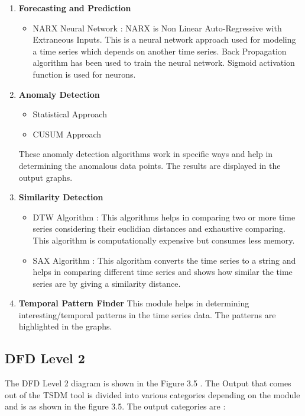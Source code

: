 \documentclass[12pt,a4paper]{report}
\begin{document}
\begin{enumerate}

\item \textbf{Forecasting and Prediction}
\begin{itemize}
\item  NARX Neural Network : NARX is Non Linear Auto-Regressive with Extraneous Inputs. This is a neural network approach used for modeling a time series which depends on another time series. Back Propagation algorithm has been used to train the neural network.
Sigmoid activation function is  used for neurons. 
\end{itemize}

\item \textbf{Anomaly Detection }

\begin{itemize}
\item  Statistical Approach 
\item  CUSUM Approach 
\end{itemize}
These anomaly detection algorithms work in specific ways and help in determining the anomalous data points. The results are displayed in the output graphs.
\item \textbf{Similarity Detection }
\begin{itemize}
\item  DTW Algorithm : This algorithms helps in comparing two or more time series considering their euclidian distances and exhaustive comparing. This algorithm is computationally expensive but consumes less memory.
\item  SAX Algorithm : This algorithm converts the time series to a string and helps in comparing different time series and shows how similar the time series are by giving a similarity distance.
\end{itemize}

\item \textbf{Temporal Pattern Finder}
This module helps in determining interesting/temporal patterns in the time series data. The patterns are highlighted in the graphs.
\end{enumerate}

\subsection{DFD Level 2}
The DFD Level 2 diagram is shown in the Figure 3.5 . The Output that comes out of the TSDM tool is divided into various categories depending on the module and is as shown in the figure 3.5.
The output categories are :
\end{document}
